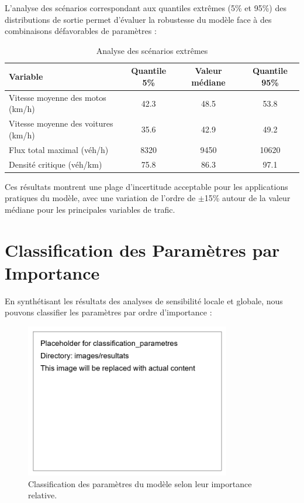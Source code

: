 L'analyse des scénarios correspondant aux quantiles extrêmes (5\% et 95\%) des distributions de sortie permet d'évaluer la robustesse du modèle face à des combinaisons défavorables de paramètres :

\begin{table}[htbp]
\centering
\caption{Analyse des scénarios extrêmes}
\label{tab:scenarios_extremes}
\begin{tabular}{lccc}
\toprule
\textbf{Variable} & \textbf{Quantile 5\%} & \textbf{Valeur médiane} & \textbf{Quantile 95\%} \\
\midrule
Vitesse moyenne des motos (km/h) & 42.3 & 48.5 & 53.8 \\
Vitesse moyenne des voitures (km/h) & 35.6 & 42.9 & 49.2 \\
Flux total maximal (véh/h) & 8320 & 9450 & 10620 \\
Densité critique (véh/km) & 75.8 & 86.3 & 97.1 \\
\bottomrule
\end{tabular}
\end{table}

Ces résultats montrent une plage d'incertitude acceptable pour les applications pratiques du modèle, avec une variation de l'ordre de $\pm$15\% autour de la valeur médiane pour les principales variables de trafic.

\section{Classification des Paramètres par Importance}
\label{sec:classification_parametres}

En synthétisant les résultats des analyses de sensibilité locale et globale, nous pouvons classifier les paramètres par ordre d'importance :

\begin{figure}[htbp]
\centering
\includegraphics[width=0.8\textwidth]{images/resultats/classification_parametres}
\caption{Classification des paramètres du modèle selon leur importance relative.}
\label{fig:classification_parametres}
\end{figure}

